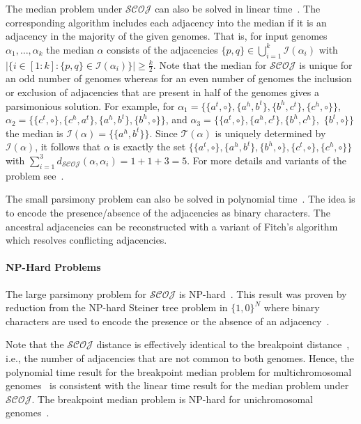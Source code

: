 \documentclass{svmult}
\newcommand{\m}[1]{\mathcal{#1}}
\begin{document}
The median problem under $\mathcal{SCOJ}$ can also be solved in linear time~\cite{Feijao_2011}. 
The corresponding algorithm includes each adjacency into the median if it is an adjacency in the majority of the given genomes.
That is, for input genomes $\alpha_1,\ldots,\alpha_k$ the median $\alpha$ consists of the adjacencies $\{p,q\} \in
\bigcup_{i=1}^k \mathcal{I}(\alpha_i)$ with
$|\{i\in [1:k]:\{p,q\} \in \mathcal{I}(\alpha_i)\}| \geq \frac{k}{2}$.
Note that the median for $\m{SCOJ}$ is unique for an odd
number of genomes whereas for an even number of genomes the inclusion or exclusion of adjacencies that are 
present in half of the genomes gives a parsimonious solution.
For example, for
$\alpha_1=\{\{a^t,\circ\},\{a^h,b^t\},\{b^h,c^t\},\{c^h,\circ\}\}$,
$\alpha_2=\{\{c^t,\circ\},\{c^h,a^t\},\{a^h,b^t\},\{b^h,\circ\}\}$, and
$\alpha_3=\{\{a^t,\circ\},\{a^h,c^t\},\{b^h,c^h\},$ $\{b^t,\circ\}\}$
the median is $\mathcal{I}(\alpha)=\{\{a^h,b^t\}\}$. 
Since $\mathcal{T}(\alpha)$ is uniquely determined by
$\mathcal{I}(\alpha)$, it follows that
$\alpha$ is exactly the set
$\{\{a^t,\circ\},\{a^h,b^t\},\{b^h,\circ\},\{c^t,\circ\},\{c^h,\circ\}\}$
with $\sum_{i=1}^3 d_{\m{SCOJ}}(\alpha,\alpha_i)= 1 + 1 + 3 = 5$.
For more details and variants of the problem see~\cite{Feijao_2011}.


The small parsimony problem can also be solved in polynomial time~\cite{Feijao_2011}. 
The idea is to encode the presence/absence of the adjacencies as binary characters. 
The ancestral adjacencies can be reconstructed 
with a variant of Fitch's algorithm~\cite{Fitch_1971} which 
resolves conflicting adjacencies.

\paragraph{NP-Hard Problems}

The large parsimony problem for $\mathcal{SCOJ}$ is NP-hard~\cite{Feijao_2011}.
This result was proven by reduction from the NP-hard Steiner tree problem in
$\{1,0\}^N$ where binary characters are used to encode the presence or the absence of an adjacency~\cite{Foulds_1982}.

Note that the $\m{SCOJ}$ distance is effectively identical to the breakpoint distance~\cite{Feijao_2011}, i.e., the number 
of adjacencies that are not common to both genomes. Hence, the polynomial time
result for the breakpoint median problem for multichromosomal genomes~\cite{Tannier_2009} is consistent with the 
linear time result for the median problem under $\m{SCOJ}$. 
The breakpoint median problem is NP-hard for unichromosomal genomes~\cite{Peer_1998}. 
\end{document}
